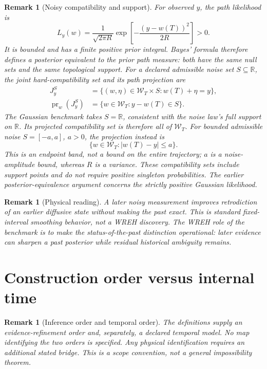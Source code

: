 \documentclass[11pt]{article}
\newtheorem{remark}[definition]{Remark}
\newcommand{\Wcal}{\mathcal W}
\begin{document}
\begin{remark}[Noisy compatibility and support]
For observed $y$, the path likelihood is
\[
L_y(w)=\frac{1}{\sqrt{2\pi R}}
\exp\!\left[-\frac{(y-w(T))^2}{2R}\right]>0.
\]
It is bounded and has a finite positive prior integral. Bayes' formula
therefore defines a posterior equivalent to the prior path measure:
both have the same null sets and the same topological support.
For a declared admissible noise set $S\subseteq\mathbb R$, the
joint hard-compatibility set and its path projection are
\[
\begin{aligned}
J_y^S&=\{(w,\eta)\in\Wcal_T\times S:w(T)+\eta=y\},\\
\operatorname{pr}_w(J_y^S)
  &=\{w\in\Wcal_T:y-w(T)\in S\}.
\end{aligned}
\]
The Gaussian benchmark takes $S=\mathbb R$, consistent with the
noise law's full support on $\mathbb R$. Its projected compatibility
set is therefore all of $\Wcal_T$. For bounded admissible noise
$S=[-a,a]$, $a>0$, the projection instead is
\[
\{w\in\Wcal_T:|w(T)-y|\le a\}.
\]
This is an endpoint band, not a bound on the entire trajectory;
$a$ is a noise-amplitude bound, whereas $R$ is a variance. These
compatibility sets include support points and do not require
positive singleton probabilities. The earlier posterior-equivalence
argument concerns the strictly positive Gaussian likelihood.
\end{remark}

\begin{remark}[Physical reading]
A later noisy measurement improves retrodiction of an earlier diffusive state without making
the past exact. This is standard fixed-interval smoothing behavior, not a WREH discovery.
The WREH role of the benchmark is to make the status-of-the-past distinction operational:
later evidence can sharpen a past posterior while residual historical ambiguity remains.
\end{remark}

\section{Construction order versus internal time}
\begin{remark}[Inference order and temporal order]
The definitions supply an evidence-refinement order and, separately,
a declared temporal model. No map identifying the two orders is
specified. Any physical identification requires an additional stated
bridge. This is a scope convention, not a general impossibility theorem.
\end{remark}
\end{document}
